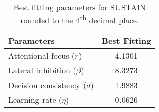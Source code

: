 \begin{table}[h]

\caption{\label{tab:parameters}Best fitting parameters for SUSTAIN rounded to the
4\textsuperscript{th} decimal place.}
\centering
\begin{tabular}[t]{lc}
\hline
Parameters & Best Fitting \\
\hline
Attentional focus ($r$) & 4.1301 \\
Lateral inhibition ($\beta$) & 8.3273 \\
Decision consistency ($d$) & 1.9883 \\
Learning rate ($\eta$) & 0.0626 \\
\hline
\end{tabular}
\end{table}
